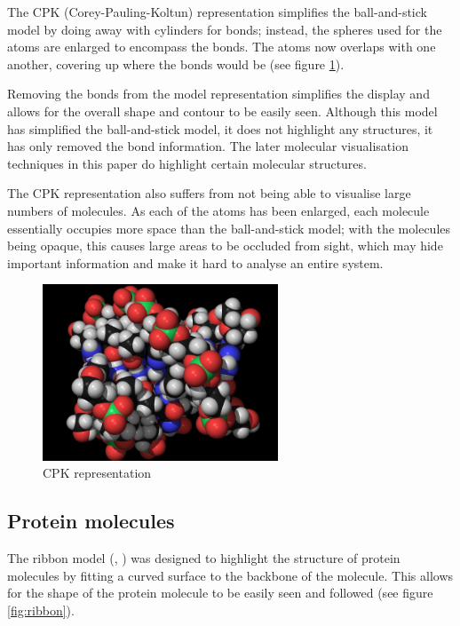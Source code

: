 The CPK (Corey-Pauling-Koltun) \citep{corey53} representation simplifies the
ball-and-stick model by doing away with cylinders for bonds; instead, the
spheres used for the atoms are enlarged to encompass the bonds. The atoms now
overlaps with one another, covering up where the bonds would be (see figure
\ref{fig:cpk}).

Removing the bonds from the model representation simplifies the display and
allows for the overall shape and contour to be easily seen. Although this model
has simplified the ball-and-stick model, it does not highlight any structures,
it has only removed the bond information. The later molecular visualisation
techniques in this paper do highlight certain molecular structures.

The CPK representation also suffers from not being able to visualise large
numbers of molecules. As each of the atoms has been enlarged, each molecule
essentially occupies more space than the ball-and-stick model; with the
molecules being opaque, this causes large areas to be occluded from sight, which
may hide important information and make it hard to analyse an entire system.

\begin{figure}[h!]
  \begin{center}
    \includegraphics[width=70mm]{CPK-big}
  \end{center}
  \caption{CPK representation}
  \label{fig:cpk}
\end{figure}


\subsection{Protein molecules}
\label{sub:protein}

The ribbon model (\citep{richardson81}, \citep{carson87}) was designed to
highlight the structure of protein molecules by fitting a curved surface to the
backbone of the molecule. This allows for the shape of the protein molecule to
be easily seen and followed (see figure \ref{fig:ribbon}).

